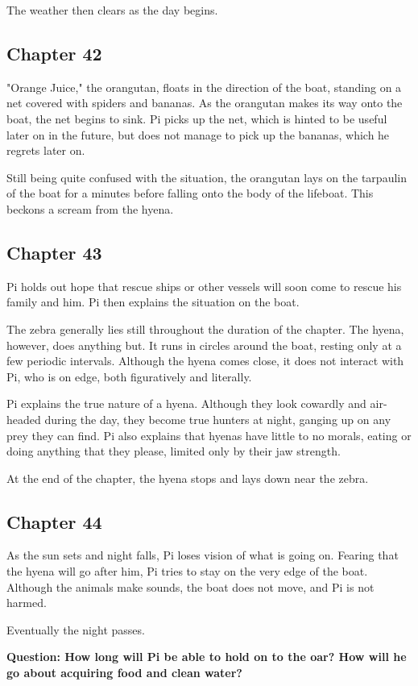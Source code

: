 \documentclass[11pt]{article}
\begin{document}
The weather then clears as the day begins.
\subsection{Chapter 42}
\label{sec:orgc355f9f}
"Orange Juice," the orangutan, floats in the direction of the boat, standing on a net covered with spiders and bananas. As the orangutan makes its way onto the boat, the net begins to sink. Pi picks up the net, which is hinted to be useful later on in the future, but does not manage to pick up the bananas, which he regrets later on.

Still being quite confused with the situation, the orangutan lays on the tarpaulin of the boat for a minutes before falling onto the body of the lifeboat. This beckons a scream from the hyena.
\subsection{Chapter 43}
\label{sec:org3812c5c}
Pi holds out hope that rescue ships or other vessels will soon come to rescue his family and him. Pi then explains the situation on the boat.

The zebra generally lies still throughout the duration of the chapter. The hyena, however, does anything but. It runs in circles around the boat, resting only at a few periodic intervals. Although the hyena comes close, it does not interact with Pi, who is on edge, both figuratively and literally.

Pi explains the true nature of a hyena. Although they look cowardly and air-headed during the day, they become true hunters at night, ganging up on any prey they can find. Pi also explains that hyenas have little to no morals, eating or doing anything that they please, limited only by their jaw strength.

At the end of the chapter, the hyena stops and lays down near the zebra.
\subsection{Chapter 44}
\label{sec:org6a8c082}
As the sun sets and night falls, Pi loses vision of what is going on. Fearing that the hyena will go after him, Pi tries to stay on the very edge of the boat. Although the animals make sounds, the boat does not move, and Pi is not harmed.

Eventually the night passes.

\textbf{Question: How long will Pi be able to hold on to the oar? How will he go about acquiring food and clean water?}
\end{document}
